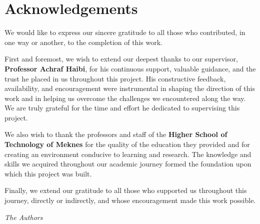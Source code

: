 \chapter*{Acknowledgements}

We would like to express our sincere gratitude to all those who contributed, in one way or another, to the completion of this work.

First and foremost, we wish to extend our deepest thanks to our supervisor, \textbf{Professor Achraf Haibi}, for his continuous support, valuable guidance, and the trust he placed in us throughout this project. His constructive feedback, availability, and encouragement were instrumental in shaping the direction of this work and in helping us overcome the challenges we encountered along the way. We are truly grateful for the time and effort he dedicated to supervising this project.

We also wish to thank the professors and staff of the \textbf{Higher School of Technology of Meknes} for the quality of the education they provided and for creating an environment conducive to learning and research. The knowledge and skills we acquired throughout our academic journey formed the foundation upon which this project was built.

Finally, we extend our gratitude to all those who supported us throughout this journey, directly or indirectly, and whose encouragement made this work possible.

\vspace{1cm}
\begin{flushright}
\textit{The Authors}
\end{flushright}
